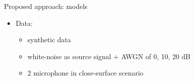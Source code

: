 \begin{frame}{Proposed approach: models \hfill\faProjectDiagram}
\begin{itemize}
        \pause[6]
        \item Data:
        \begin{itemize}
            \item synthetic data
            \item white-noise as source signal + AWGN of 0, 10, 20 dB
            \item 2 microphone in close-surface scenario
        \end{itemize}
    \end{itemize}


\end{frame}

